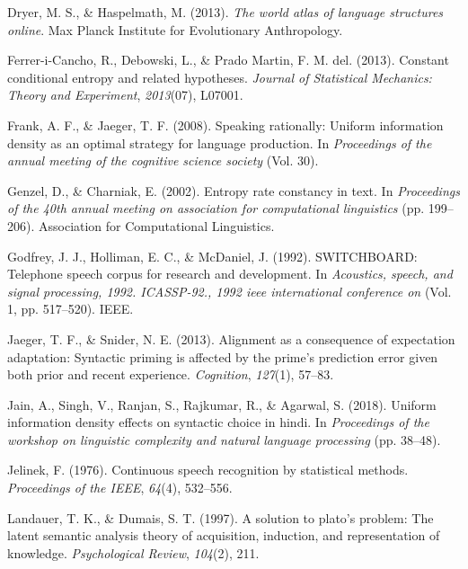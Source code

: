 \documentclass[10pt, letterpaper]{article}
\begin{document}
\leavevmode\hypertarget{ref-dryer2013}{}%
Dryer, M. S., \& Haspelmath, M. (2013). \emph{The world atlas of
language structures online}. Max Planck Institute for Evolutionary
Anthropology.

\leavevmode\hypertarget{ref-ferrer-i-cancho2013}{}%
Ferrer-i-Cancho, R., Debowski, L., \& Prado Martin, F. M. del. (2013).
Constant conditional entropy and related hypotheses. \emph{Journal of
Statistical Mechanics: Theory and Experiment}, \emph{2013}(07), L07001.

\leavevmode\hypertarget{ref-frank2008}{}%
Frank, A. F., \& Jaeger, T. F. (2008). Speaking rationally: Uniform
information density as an optimal strategy for language production. In
\emph{Proceedings of the annual meeting of the cognitive science
society} (Vol. 30).

\leavevmode\hypertarget{ref-genzel2002}{}%
Genzel, D., \& Charniak, E. (2002). Entropy rate constancy in text. In
\emph{Proceedings of the 40th annual meeting on association for
computational linguistics} (pp. 199--206). Association for Computational
Linguistics.

\leavevmode\hypertarget{ref-godfrey1992}{}%
Godfrey, J. J., Holliman, E. C., \& McDaniel, J. (1992). SWITCHBOARD:
Telephone speech corpus for research and development. In
\emph{Acoustics, speech, and signal processing, 1992. ICASSP-92., 1992
ieee international conference on} (Vol. 1, pp. 517--520). IEEE.

\leavevmode\hypertarget{ref-jaeger2013}{}%
Jaeger, T. F., \& Snider, N. E. (2013). Alignment as a consequence of
expectation adaptation: Syntactic priming is affected by the prime's
prediction error given both prior and recent experience.
\emph{Cognition}, \emph{127}(1), 57--83.

\leavevmode\hypertarget{ref-jain2018}{}%
Jain, A., Singh, V., Ranjan, S., Rajkumar, R., \& Agarwal, S. (2018).
Uniform information density effects on syntactic choice in hindi. In
\emph{Proceedings of the workshop on linguistic complexity and natural
language processing} (pp. 38--48).

\leavevmode\hypertarget{ref-jelinek1976}{}%
Jelinek, F. (1976). Continuous speech recognition by statistical
methods. \emph{Proceedings of the IEEE}, \emph{64}(4), 532--556.

\leavevmode\hypertarget{ref-landauer1997}{}%
Landauer, T. K., \& Dumais, S. T. (1997). A solution to plato's problem:
The latent semantic analysis theory of acquisition, induction, and
representation of knowledge. \emph{Psychological Review}, \emph{104}(2),
211.
\end{document}
